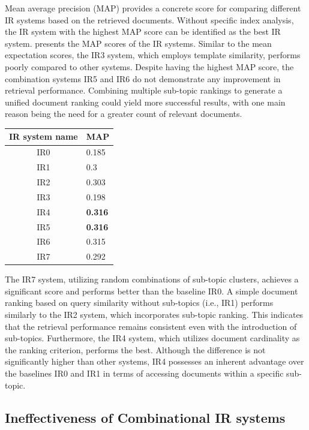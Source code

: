 Mean average precision (MAP) provides a concrete score for comparing different IR systems based on the retrieved documents. Without specific index analysis, the IR system with the highest MAP score can be identified as the best IR system.  presents the MAP scores of the IR systems. Similar to the mean expectation scores, the IR3 system, which employs template similarity, performs poorly compared to other systems. Despite having the highest MAP score, the combination systems IR5 and IR6 do not demonstrate any improvement in retrieval performance. Combining multiple sub-topic rankings to generate a unified document ranking could yield more successful results, with one main reason being the need for a greater count of relevant documents.


\begin{center}
	\label{tab:map_results}
		\begin{tabularx}{0.4\textwidth}{|c|Y|}
		\hline
		IR system name & MAP \\
		\hline
		IR0 & 0.185 \\
		\hline
		IR1 &  0.3 \\
		\hline
		IR2 &  0.303 \\
		\hline
		IR3 &  0.198 \\
		\hline
		IR4 &   \textbf{0.316} \\
		\hline
		IR5 &    \textbf{0.316} \\
		\hline
		IR6 &   0.315\\
		\hline
		IR7 &  0.292 \\
		\hline
	\end{tabularx}
\end{center}


The IR7 system, utilizing random combinations of sub-topic clusters, achieves a significant score and performs better than the baseline IR0. A simple document ranking based on query similarity without sub-topics (i.e., IR1) performs similarly to the IR2 system, which incorporates sub-topic ranking. This indicates that the retrieval performance remains consistent even with the introduction of sub-topics. Furthermore, the IR4 system, which utilizes document cardinality as the ranking criterion, performs the best. Although the difference is not significantly higher than other systems, IR4 possesses an inherent advantage over the baselines IR0 and IR1 in terms of accessing documents within a specific sub-topic.

\subsection{Ineffectiveness of Combinational IR systems}

